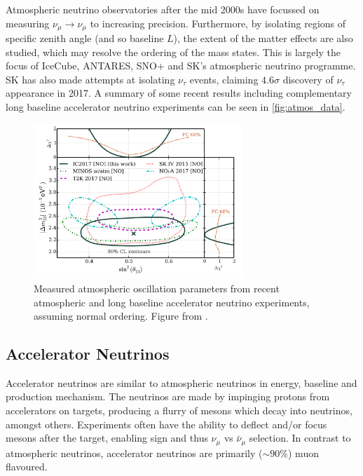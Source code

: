 Atmospheric neutrino observatories after the mid 2000s have focussed on measuring $\nu_\mu\rightarrow\nu_\mu$ to increasing precision. Furthermore, by isolating regions of specific zenith angle (and so baseline $L$), the extent of the matter effects are also studied, which may resolve the ordering of the mass states. This is largely the focus of IceCube\cite{icecube}, ANTARES\cite{antares}, SNO+ and SK's atmospheric neutrino programme. SK has also made attempts at isolating $\nu_\tau$ events\cite{superk_tau}, claiming $4.6\sigma$ discovery of $\nu_\tau$ appearance in 2017. A summary of some recent results including complementary long baseline accelerator neutrino experiments can be seen in \autoref{fig:atmos_data}.
\begin{figure}[h]
	\includegraphics[width=0.7\textwidth, trim={0mm 0mm 0mm 0mm}, clip,page=1]{figures/theory/icecube_comp}
	\caption{Measured atmospheric oscillation parameters from recent atmospheric and long baseline accelerator neutrino experiments, assuming normal ordering. Figure from \cite{icecube}.}
	\label{fig:atmos_data}
\end{figure}

\subsection{Accelerator Neutrinos}
Accelerator neutrinos are similar to atmospheric neutrinos in energy, baseline and production mechanism. The neutrinos are made by impinging protons from accelerators on targets, producing a flurry of mesons which decay into neutrinos, amongst others. Experiments often have the ability to deflect and/or focus mesons after the target, enabling sign and thus $\nu_\mu$ vs $\bar{\nu}_\mu$ selection. In contrast to atmospheric neutrinos, accelerator neutrinos are primarily ($\sim90\%$) muon flavoured.

